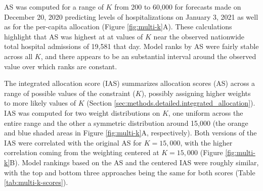 \documentclass{article}\usepackage[]{graphicx}\usepackage[]{xcolor}
\begin{document}



AS was computed for a range of $K$ from 200 to 60,000 for forecasts made on December 20, 2020 predicting levels of
hospitalizations on January 3, 2021 as well as for the per-capita allocation (Figure \ref{fig:multi-k}A). These
calculations highlight that AS was highest at at values of $K$ near the observed nationwide total hospital admissions of
19,581 that day. Model ranks by AS were fairly stable across all $K$, and there appears
to be an substantial interval around the observed value over which ranks are constant.

The integrated allocation score (IAS) summarizes allocation scores (AS) across a range of possible values of the
constraint ($K$), possibly assigning higher weights to more likely values of $K$ (Section
\ref{sec:methods.detailed.integrated_allocation}). IAS was computed for two weight distributions on $K$, one uniform
across the entire range and the other a symmetric distribution around 15,000 (the orange and blue shaded areas in Figure
\ref{fig:multi-k}A, respectively). Both versions of the IAS were correlated with the original AS for $K=15,000$, with
the higher correlation coming from the weighting centered at $K=15,000$ (Figure \ref{fig:multi-k}B). Model rankings
based on the AS and the centered IAS were roughly similar, with the top and bottom three approaches being the same for
both scores (Table \ref{tab:multi-k-scores}).
\end{document}
